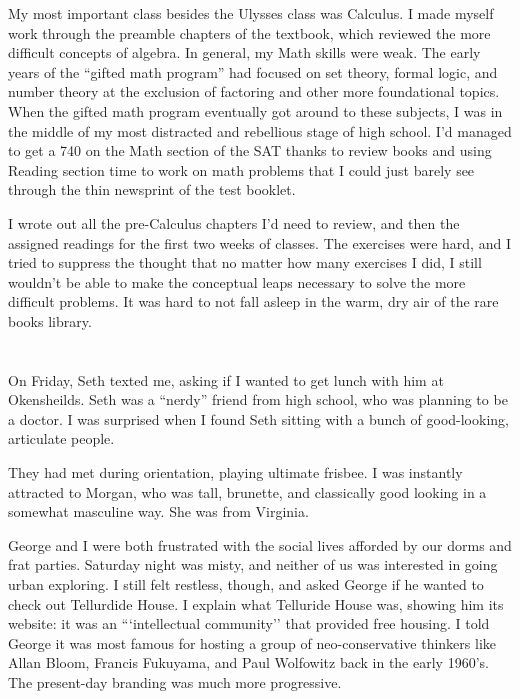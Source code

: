 My most important class besides the Ulysses class was Calculus.  I made myself
work through the preamble chapters of the textbook, which reviewed the more
difficult concepts of algebra.  In general, my Math skills were weak.  The early
years of the ``gifted math program'' had focused on set theory, formal logic,
and number theory at the exclusion of factoring and other more foundational
topics.  When the gifted math program eventually got around to these subjects, I
was in the middle of my most distracted and rebellious stage of high school.
I'd managed to get a 740 on the Math section of the SAT thanks to review books
and using Reading section time to work on math problems that I could just barely
see through the thin newsprint of the test booklet. 


I wrote out all the pre-Calculus chapters I'd need to review, and then the
assigned readings for the first two weeks of classes.  The exercises were hard,
and I tried to suppress the thought that no matter how many exercises I did, I
still wouldn't be able to make the conceptual leaps necessary to solve the more
difficult problems.  It was hard to not fall asleep in the warm, dry air of the
rare books library.

\section{}

On Friday, Seth texted me, asking if I wanted to get lunch with him at
Okensheilds.  Seth was a ``nerdy'' friend from high school, who was planning to
be a doctor.  I was surprised when I found Seth sitting with a bunch of
good-looking, articulate people.

They had met during orientation, playing ultimate frisbee.  I was instantly
attracted to Morgan, who was tall, brunette, and classically good looking in a
somewhat masculine way.  She was from Virginia. 

George and I were both frustrated with the social lives afforded by our dorms
and frat parties.  Saturday night was misty, and neither of us was interested in
going urban exploring.  I still felt restless, though, and asked George if he
wanted to check out Tellurdide House.  I explain what Telluride House was,
showing him its website: it was an ```intellectual community'' that provided
free housing.  I told George it was most famous for hosting a group of
neo-conservative thinkers like Allan Bloom, Francis Fukuyama, and Paul Wolfowitz
back in the early 1960's.  The present-day branding was much more progressive.

